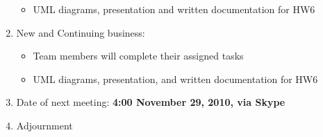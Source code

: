 \documentclass[12pt, oneside, letterpaper]{article}
\begin{document}
\begin{enumerate}
\begin{itemize}
\item UML diagrams, presentation and written documentation for HW6
\end{itemize}
\item{New and Continuing business:}
\begin{itemize}
\item Team members will complete their assigned tasks
\item UML diagrams, presentation, and written documentation for HW6
\end{itemize}
\item{Date of next meeting: \textbf{4:00 November 29, 2010, via Skype}}
\item{Adjournment}
\end{enumerate}
\end{document}
